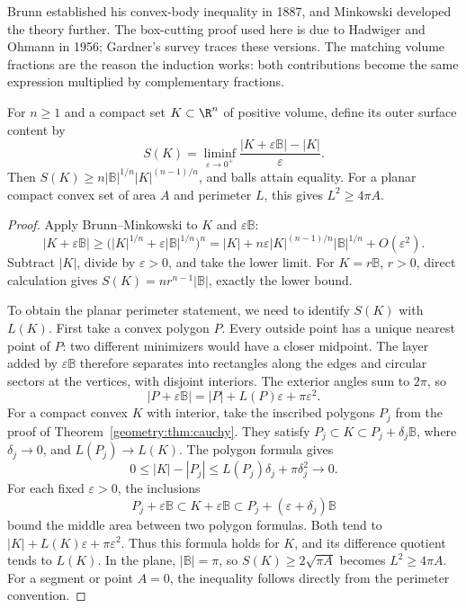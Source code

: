 Brunn established his convex-body inequality in 1887, and Minkowski developed the theory further. The box-cutting proof used here is due to Hadwiger and Ohmann in 1956; Gardner's survey traces these versions. The matching volume fractions are the reason the induction works: both contributions become the same expression multiplied by complementary fractions.

\begin{corollary}\label{geometry:cor:isoperimetric}
For $n\ge1$ and a compact set $K\subset\R^n$ of positive volume, define its outer surface content by
\[
S(K)=\liminf_{\varepsilon\to0^+}
\frac{|K+\varepsilon\mathbb B|-|K|}{\varepsilon}.
\]
Then $S(K)\ge n|\mathbb B|^{1/n}|K|^{(n-1)/n}$, and balls attain equality. For a planar compact convex set of area $A$ and perimeter $L$, this gives $L^2\ge4\pi A$.
\end{corollary}

\begin{proof}
Apply Brunn--Minkowski to $K$ and $\varepsilon\mathbb B$:
\[
|K+\varepsilon\mathbb B|
\ge\bigl(|K|^{1/n}+\varepsilon|\mathbb B|^{1/n}\bigr)^n
=|K|+n\varepsilon|K|^{(n-1)/n}|\mathbb B|^{1/n}+O(\varepsilon^2).
\]
Subtract $|K|$, divide by $\varepsilon>0$, and take the lower limit. For $K=r\mathbb B$, $r>0$, direct calculation gives $S(K)=nr^{n-1}|\mathbb B|$, exactly the lower bound.

To obtain the planar perimeter statement, we need to identify $S(K)$ with $L(K)$. First take a convex polygon $P$. Every outside point has a unique nearest point of $P$: two different minimizers would have a closer midpoint. The layer added by $\varepsilon\mathbb B$ therefore separates into rectangles along the edges and circular sectors at the vertices, with disjoint interiors. The exterior angles sum to $2\pi$, so
\[
|P+\varepsilon\mathbb B|=|P|+L(P)\varepsilon+\pi\varepsilon^2.
\]
For a compact convex $K$ with interior, take the inscribed polygons $P_j$ from the proof of Theorem~\ref{geometry:thm:cauchy}. They satisfy
$P_j\subset K\subset P_j+\delta_j\mathbb B$, where $\delta_j\to0$, and $L(P_j)\to L(K)$. The polygon formula gives
\[
0\le |K|-|P_j|\le L(P_j)\delta_j+\pi\delta_j^2\longrightarrow0.
\]
For each fixed $\varepsilon>0$, the inclusions
\[
P_j+\varepsilon\mathbb B\subset K+\varepsilon\mathbb B
\subset P_j+(\varepsilon+\delta_j)\mathbb B
\]
bound the middle area between two polygon formulas. Both tend to
$|K|+L(K)\varepsilon+\pi\varepsilon^2$. Thus this formula holds for $K$, and its difference quotient tends to $L(K)$. In the plane, $|\mathbb B|=\pi$, so $S(K)\ge2\sqrt{\pi A}$ becomes $L^2\ge4\pi A$. For a segment or point $A=0$, the inequality follows directly from the perimeter convention.
\end{proof}

